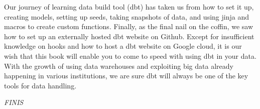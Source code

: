 \documentclass[
]{book}
\begin{document}
Our journey of learning data build tool (dbt) has taken us from how to set it up, creating models, setting up seeds, taking snapshots of data, and using jinja and macros to create custom functions. Finally, as the final nail on the coffin, we saw how to set up an externally hosted dbt website on Github. Except for insufficient knowledge on hooks and how to host a dbt website on Google cloud, it is our wish that this book will enable you to come to speed with using dbt in your data. With the growth of using data warehouses and exploiting big data already happening in various institutions, we are sure dbt will always be one of the key tools for data handling.

\emph{FINIS}

  
\end{document}
